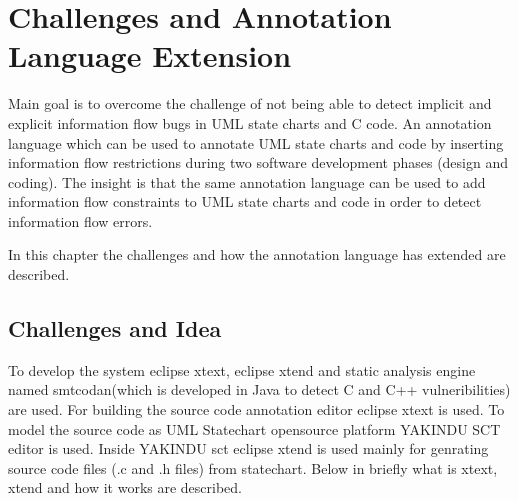 \chapter{ Challenges and Annotation Language Extension}
Main goal is to overcome the challenge of not being able
to detect implicit and explicit information flow bugs in UML state charts and C code. An annotation language
which can be used to annotate UML state charts and code by inserting information flow
restrictions during two software development phases (design
and coding). The insight is that the same annotation language can be used to add information flow constraints to UML state charts and code in order to detect information flow errors.
 
In this chapter the challenges and how the annotation language has extended are described.

\section{Challenges and Idea}

To develop the system eclipse xtext, eclipse xtend and static analysis engine named smtcodan(which is developed in Java to detect C and C++ vulneribilities) are used. For building the source code annotation editor eclipse xtext is used. To model the source code as UML Statechart opensource platform YAKINDU SCT editor is used. Inside YAKINDU sct eclipse xtend is used mainly for genrating source code files (.c and .h files) from statechart. Below in briefly what is xtext, xtend and how it works are described.

